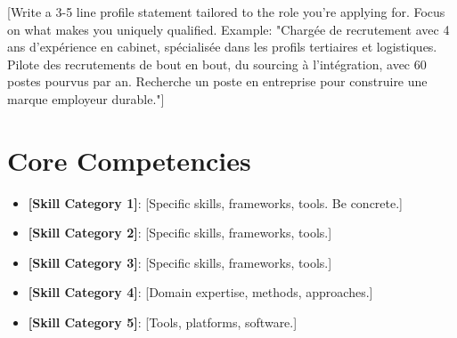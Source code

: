 \documentclass[11pt,a4paper,sans]{moderncv}
\begin{document}
\makecvtitle


\vspace{6pt}
\small{[Write a 3-5 line profile statement tailored to the role you're applying for. Focus on what makes you uniquely qualified. Example: "Chargée de recrutement avec 4 ans d'expérience en cabinet, spécialisée dans les profils tertiaires et logistiques. Pilote des recrutements de bout en bout, du sourcing à l'intégration, avec 60 postes pourvus par an. Recherche un poste en entreprise pour construire une marque employeur durable."]}


\section{Core Competencies}
\vspace{1pt}
\begin{itemize}

\item \textbf{[Skill Category 1]}: [Specific skills, frameworks, tools. Be concrete.]

\item \textbf{[Skill Category 2]}: [Specific skills, frameworks, tools.]

\item \textbf{[Skill Category 3]}: [Specific skills, frameworks, tools.]

\item \textbf{[Skill Category 4]}: [Domain expertise, methods, approaches.]

\item \textbf{[Skill Category 5]}: [Tools, platforms, software.]

\end{itemize}

\end{document}
